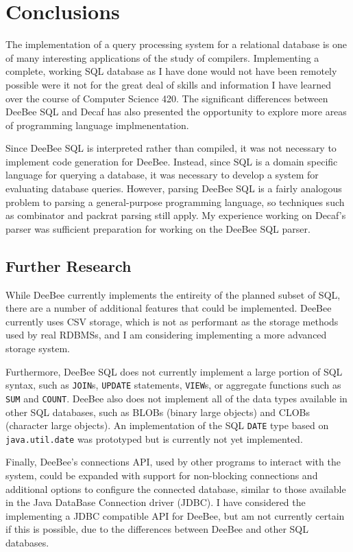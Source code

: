 \section{Conclusions}

The implementation of a query processing system for a relational database is one of many interesting applications of the study of compilers. Implementing a complete, working SQL database as I have done would not have been remotely possible were it not for the great deal of skills and information I have learned over the course of Computer Science 420. The significant differences between DeeBee SQL and Decaf has also presented the opportunity to explore more areas of programming language implmenentation. 

Since DeeBee SQL is interpreted rather than compiled, it was not necessary to implement code generation for DeeBee. Instead, since SQL is a domain specific language for querying a database, it was necessary to develop a system for evaluating database queries. However, parsing DeeBee SQL is a fairly analogous problem to parsing a general-purpose programming language, so techniques such as combinator and packrat parsing still apply. My experience working on Decaf's parser was sufficient preparation for working on the DeeBee SQL parser.

\subsection{Further Research}
While DeeBee currently implements the entireity of the planned subset of SQL, there are a number of additional features that could be implemented. DeeBee currently uses CSV storage, which is not as performant as the storage methods used by real RDBMSs, and I am considering implementing a more advanced storage system. 

Furthermore, DeeBee SQL does not currently implement a large portion of SQL syntax, such as \texttt{JOIN}s, \texttt{UPDATE} statements, \texttt{VIEW}s, or aggregate functions such as \texttt{SUM} and \texttt{COUNT}. DeeBee also does not implement all of the data types available in other SQL databases, such as BLOBs (binary large objects) and CLOBs (character large objects). An implementation of the SQL \texttt{DATE} type based on \texttt{java.util.date} was prototyped but is currently not yet implemented. 

Finally, DeeBee's connections API, used by other programs to interact with the system, could be expanded with support for non-blocking connections and additional options to configure the connected database, similar to those available in the Java DataBase Connection driver (JDBC). I have considered the implementing a JDBC compatible API for DeeBee, but am not currently certain if this is possible, due to the differences between DeeBee and other SQL databases.
\pagebreak
{}



